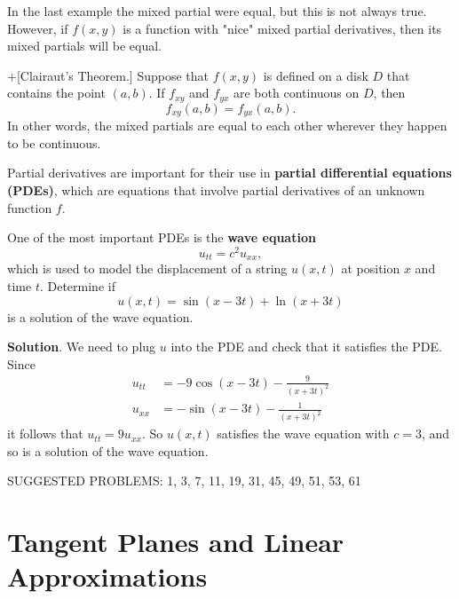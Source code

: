 \documentclass[10pt,]{book}
\newcommand{\terminology}[1]{\textbf{#1}}
\theoremstyle{ptxplainnotitle}
\theoremstyle{ptxplaintitle}
\theoremstyle{ptxplainnotitle}
\theoremstyle{ptxplaintitle}
\theoremstyle{ptxplainnotitle}
\theoremstyle{ptxplaintitle}
\theoremstyle{ptxdefinitionnotitle}
\theoremstyle{ptxdefinitiontitle}
\theoremstyle{ptxdefinitionnotitle}
\theoremstyle{ptxdefinitiontitle}
\theoremstyle{ptxdefinitionnotitle}
\theoremstyle{ptxdefinitiontitle}
\theoremstyle{ptxdefinitionnotitle}
\theoremstyle{ptxdefinitiontitle}
\theoremstyle{ptxdefinitionnotitle}
\theoremstyle{ptxdefinitiontitle}
\numberwithin{equation}{section}
\begin{document}
\hypertarget{p-1021}{}%
In the last example the mixed partial were equal, but this is not always true. However, if \(f(x,y)\) is a function with "nice" mixed partial derivatives, then its mixed partials will be equal.%
\begin{theorem}+[{Clairaut's Theorem.}]\label{theorem-clairaut-s-theorem}
\hypertarget{p-1022}{}%
Suppose that \(f(x,y)\) is defined on a disk \(D\) that contains the point \((a,b)\). If \(f_{xy}\) and \(f_{yx}\) are both continuous on \(D\), then%
\begin{equation*}
f_{xy}(a,b) = f_{yx}(a,b).
\end{equation*}
In other words, the mixed partials are equal to each other wherever they happen to be continuous.%
\end{theorem}
\hypertarget{p-1023}{}%
Partial derivatives are important for their use in \terminology{partial differential equations (PDEs)}, which are equations that involve partial derivatives of an unknown function \(f\).%
\begin{example}\label{example-the-wave-equation}
\hypertarget{p-1024}{}%
One of the most important PDEs is the \terminology{wave equation}%
\begin{equation*}
u_{tt} = c^{2}u_{xx},
\end{equation*}
which is used to model the displacement of a string \(u(x,t)\) at position \(x\) and time \(t\). Determine if%
\begin{equation*}
u(x,t) = \sin(x-3t) + \ln(x+3t)
\end{equation*}
is a solution of the wave equation.%
\par\smallskip%
\noindent\textbf{Solution}.\hypertarget{solution-158}{}\quad%
\hypertarget{p-1025}{}%
We need to plug \(u\) into the PDE and check that it satisfies the PDE. Since%
\begin{align*}
u_{tt} & = -9\cos(x-3t) - \frac{9}{(x+3t)^{2}} \\
u_{xx} & = -\sin(x-3t) - \frac{1}{(x+3t)^{2}} 
\end{align*}
it follows that \(u_{tt} = 9u_{xx}\). So \(u(x,t)\) satisfies the wave equation with \(c=3\), and so is a solution of the wave equation.%
\end{example}
\hypertarget{p-1026}{}%
SUGGESTED PROBLEMS: 1, 3, 7, 11, 19, 31, 45, 49, 51, 53, 61%
\typeout{************************************************}
\typeout{************************************************}
\section[{Tangent Planes and Linear Approximations}]{Tangent Planes and Linear Approximations}\label{section-tangent-planes-and-linear-approximations}
\typeout{************************************************}
\typeout{************************************************}
\end{document}
